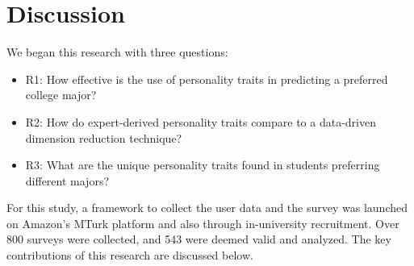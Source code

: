 \documentclass[conference]{IEEEtran}
\begin{document}






\section{Discussion}\label{sec5}
We began this research with three questions:
\begin{itemize}
    \item R1: How effective is the use of personality traits in predicting a preferred college major?
    \item R2: How do expert-derived personality traits compare to a data-driven dimension reduction technique?
    \item R3: What are the unique personality traits found in students preferring different majors?
\end{itemize}
For this study, a framework to collect the user data and the survey was launched on
Amazon’s MTurk platform and also through in-university recruitment. Over 800
surveys were collected, and 543 were deemed valid and analyzed. The key contributions of this research are discussed below.
\end{document}
